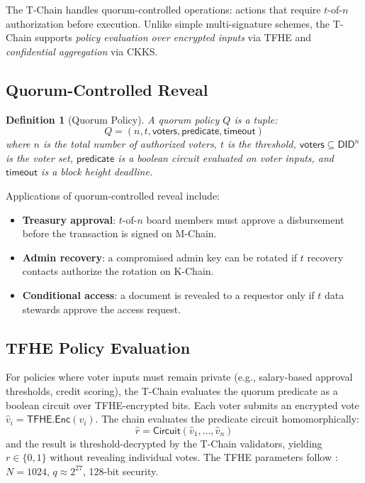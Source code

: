\documentclass[11pt,a4paper]{article}
\newtheorem{definition}{Definition}[section]
\begin{document}
The T-Chain handles quorum-controlled operations: actions that require $t$-of-$n$
authorization before execution. Unlike simple multi-signature schemes, the T-Chain
supports \emph{policy evaluation over encrypted inputs} via TFHE and \emph{confidential
aggregation} via CKKS.

\subsection{Quorum-Controlled Reveal}

\begin{definition}[Quorum Policy]\label{def:quorum}
A quorum policy $Q$ is a tuple:
\[
    Q = (n, t, \mathsf{voters}, \mathsf{predicate}, \mathsf{timeout})
\]
where $n$ is the total number of authorized voters, $t$ is the threshold,
$\mathsf{voters} \subseteq \mathsf{DID}^n$ is the voter set,
$\mathsf{predicate}$ is a boolean circuit evaluated on voter inputs,
and $\mathsf{timeout}$ is a block height deadline.
\end{definition}

Applications of quorum-controlled reveal include:
\begin{itemize}
    \item \textbf{Treasury approval}: $t$-of-$n$ board members must approve a
          disbursement before the transaction is signed on M-Chain.
    \item \textbf{Admin recovery}: a compromised admin key can be rotated if $t$
          recovery contacts authorize the rotation on K-Chain.
    \item \textbf{Conditional access}: a document is revealed to a requestor only
          if $t$ data stewards approve the access request.
\end{itemize}

\subsection{TFHE Policy Evaluation}

For policies where voter inputs must remain private (e.g., salary-based approval
thresholds, credit scoring), the T-Chain evaluates the quorum predicate as a
boolean circuit over TFHE-encrypted bits. Each voter submits an encrypted vote
$\hat{v}_i = \mathsf{TFHE.Enc}(v_i)$. The chain evaluates the predicate
circuit homomorphically:
\[
    \hat{r} = \mathsf{Circuit}(\hat{v}_1, \ldots, \hat{v}_n)
\]
and the result is threshold-decrypted by the T-Chain validators, yielding
$r \in \{0, 1\}$ without revealing individual votes. The TFHE parameters
follow \cite{lux-tfhe}: $N = 1024$, $q \approx 2^{27}$, 128-bit security.
\end{document}
